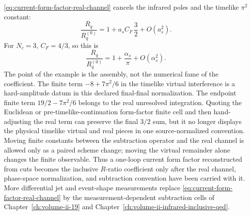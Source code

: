 \begin{controlledapproximation}
\eqref{eq:current-form-factor-real-channel} cancels the infrared poles and
the timelike \(\pi^2\) constant:
\begin{equation}
  \frac{R_q}{R_q^{(0)}}
  =
  1+a_s C_F\,\frac32+O(a_s^2).
  \label{eq:current-form-factor-r-ratio-closure}
\end{equation}
For \(N_c=3\), \(C_F=4/3\), so this is
\[
  \frac{R_q}{R_q^{(0)}}=1+\frac{\alpha_s}{\pi}+O(\alpha_s^2).
\]
The point of the example is the assembly, not the numerical fame of the
coefficient.  The finite term \(-8+7\pi^2/6\) in the timelike virtual
interference is a hard-amplitude datum in this declared final-final
normalization.  The endpoint finite term \(19/2-7\pi^2/6\) belongs to the
real unresolved integration.  Quoting the Euclidean or pre-timelike-continuation
form-factor finite cell and then hand-adjusting the real term can preserve the
final \(3/2\) sum, but it no longer displays the physical timelike virtual
and real pieces in one source-normalized convention.  Moving finite constants
between the subtraction operator and the real channel is allowed only as a
paired scheme change; moving the virtual remainder alone changes the finite
observable.
Thus a one-loop current form factor reconstructed from cuts becomes the
inclusive \(R\)-ratio coefficient only after the real channel, phase-space
normalization, and subtraction convention have been carried with it.  More
differential jet and event-shape measurements replace
\eqref{eq:current-form-factor-real-channel} by the measurement-dependent
subtraction cells of Chapter~\ref{ch:volume-ii-19} and
Chapter~\ref{ch:volume-ii-infrared-inclusive-qed}.
\end{controlledapproximation}

